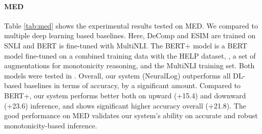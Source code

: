 \documentclass[11pt,a4paper]{article}
\begin{document}
\begin{table}[t!]
\caption{\label{tab:med} Results comparing  model compared to state-of-art NLI models evaluated on MED. \textbf{Up}, \textbf{Down}, and \textbf{All} stand for the accuracy on upward inference, downward inference, and the overall dataset.}
\end{table}

\paragraph{MED}
Table \ref{tab:med} shows the experimental results tested on MED. We compared to multiple deep learning based baselines. Here, DeComp and ESIM are trained on SNLI and BERT is fine-tuned with MultiNLI. The BERT+ model is a BERT model fine-tuned on a combined training data with the HELP dataset, \cite{yanaka-etal-2019-help}, a set of  augmentations for monotonicity reasoning, and the MultiNLI training set. Both models were tested in \citet{yanaka-etal-2019-neural}. Overall, our system (NeuralLog) outperforms  all DL-based baselines in terms of accuracy, by a significant amount. Compared to BERT+, our system performs better both on upward (+15.4) and downward (+23.6) inference, and shows significant higher accuracy overall (+21.8). The good performance on MED validates our system's ability on accurate and robust monotonicity-based inference. 
 
\end{document}
